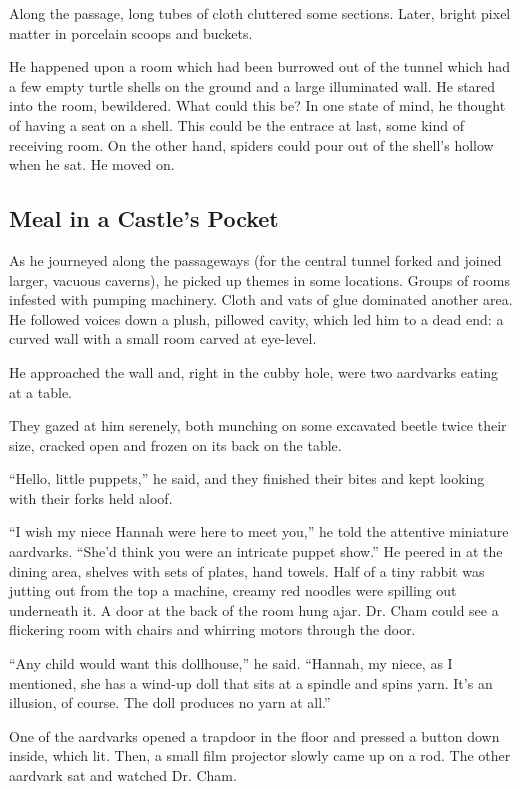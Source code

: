\documentclass[12pt,twoside]{report}
\begin{document}
Along the passage, long tubes of cloth cluttered some sections.
Later, bright pixel matter in porcelain scoops and buckets.

He happened upon a room which had been burrowed out of the tunnel
which had a few empty turtle shells on the ground and a large
illuminated wall.  He stared into the room, bewildered.  What could
this be?  In one state of mind, he thought of having a seat on a
shell.  This could be the entrace at last, some kind of receiving
room.  On the other hand, spiders could pour out of the shell's hollow
when he sat.  He moved on.



\subsection{Meal in a Castle's Pocket}



As he journeyed along the passageways (for the central tunnel forked
and joined larger, vacuous caverns), he picked up themes in some
locations.  Groups of rooms infested with pumping machinery.  Cloth
and vats of glue dominated another area.  He followed voices down a
plush, pillowed cavity, which led him to a dead end: a curved wall
with a small room carved at eye-level.

He approached the wall and, right in the cubby hole, were two
aardvarks eating at a table.

They gazed at him serenely, both munching on some excavated beetle
twice their size, cracked open and frozen on its back on the table.

``Hello, little puppets,'' he said, and they finished their bites and
kept looking with their forks held aloof.

``I wish my niece Hannah were here to meet you,'' he told the
attentive miniature aardvarks.  ``She'd think you were an intricate
puppet show.''  He peered in at the dining area, shelves with sets of
plates, hand towels.  Half of a tiny rabbit was jutting out from the
top a machine, creamy red noodles were spilling out underneath it.  A
door at the back of the room hung ajar.  Dr. Cham could see a
flickering room with chairs and whirring motors through the door.

``Any child would want this dollhouse,'' he said.  ``Hannah, my niece,
as I mentioned, she has a wind-up doll that sits at a spindle and
spins yarn.  It's an illusion, of course.  The doll produces no yarn
at all.''

One of the aardvarks opened a trapdoor in the floor and pressed a
button down inside, which lit. Then, a small film projector slowly
came up on a rod.  The other aardvark sat and watched Dr. Cham.
\end{document}
